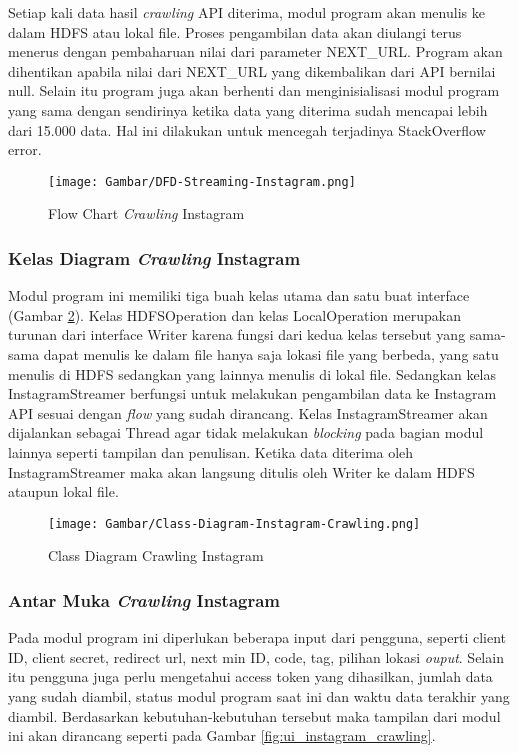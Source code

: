 Setiap kali data hasil \textit{crawling} API diterima, modul program akan menulis ke dalam HDFS atau lokal file. Proses pengambilan data akan diulangi terus menerus dengan pembaharuan nilai dari parameter NEXT\_URL. Program akan dihentikan apabila nilai dari NEXT\_URL yang dikembalikan dari API bernilai null. Selain itu program juga akan berhenti dan menginisialisasi modul program yang sama dengan sendirinya ketika data yang diterima sudah mencapai lebih dari 15.000 data. Hal ini dilakukan untuk mencegah terjadinya StackOverflow error.

\begin{figure}[H]
	\centering
	\texttt{[image: Gambar/DFD-Streaming-Instagram.png]}
	\caption[Flow Chart \textit{Crawling} Instagram]{Flow Chart \textit{Crawling} Instagram} 
	\label{fig:dfd_streaming_instagram}
\end{figure}

\subsubsection{Kelas Diagram \textit{Crawling} Instagram}
Modul program ini memiliki tiga buah kelas utama dan satu buat interface (Gambar \ref{fig:class_crawling_instagram}). Kelas HDFSOperation dan kelas LocalOperation merupakan turunan dari interface Writer karena fungsi dari kedua kelas tersebut yang sama-sama dapat menulis ke dalam file hanya saja lokasi file yang berbeda, yang satu menulis di HDFS sedangkan yang lainnya menulis di lokal file. Sedangkan kelas InstagramStreamer berfungsi untuk melakukan pengambilan data ke Instagram API sesuai dengan \textit{flow} yang sudah dirancang. Kelas InstagramStreamer akan dijalankan sebagai Thread agar tidak melakukan \textit{blocking} pada bagian modul lainnya seperti tampilan dan penulisan. Ketika data diterima oleh InstagramStreamer maka akan langsung ditulis oleh Writer ke dalam HDFS ataupun lokal file.

\begin{figure}[H]
	\centering
	\texttt{[image: Gambar/Class-Diagram-Instagram-Crawling.png]}
	\caption[Class Diagram Crawling Instagram]{Class Diagram Crawling Instagram} 
	\label{fig:class_crawling_instagram}
\end{figure}

\subsubsection{Antar Muka \textit{Crawling} Instagram}
Pada modul program ini diperlukan beberapa input dari pengguna, seperti client ID, client secret, redirect url, next min ID, code, tag, pilihan lokasi \textit{ouput}. Selain itu pengguna juga perlu mengetahui access token yang dihasilkan, jumlah data yang sudah diambil, status modul program saat ini dan waktu data terakhir yang diambil. Berdasarkan kebutuhan-kebutuhan tersebut maka tampilan dari modul ini akan dirancang seperti pada Gambar \ref{fig:ui_instagram_crawling}.

